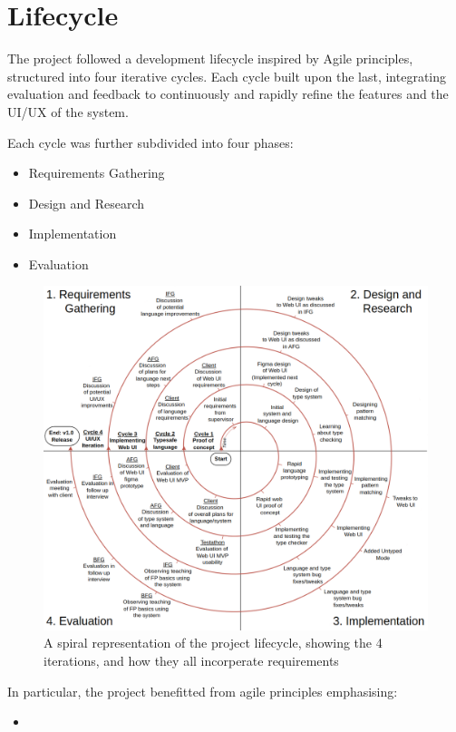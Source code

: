 \chapter{Lifecycle}
The project followed a development lifecycle inspired by Agile principles\cite{agilemanifesto2001}, structured into four iterative cycles. Each cycle built upon the last, integrating evaluation and feedback to continuously and rapidly refine the features and the UI/UX of the system. 

Each cycle was further subdivided into four phases:

\begin{itemize}
    \item Requirements Gathering
    \item Design and Research
    \item Implementation
    \item Evaluation
\end{itemize}

\begin{figure}[htbp]
    \centering
    \includegraphics[width=\linewidth]{images/spiral1.drawio.png}
    \caption{A spiral representation of the project lifecycle, showing the 4 iterations, and how they all incorperate requirements }\label{fig:spiral}
\end{figure}

In particular, the project benefitted from agile principles emphasising:
\begin{itemize}
    \item 
\end{itemize}


